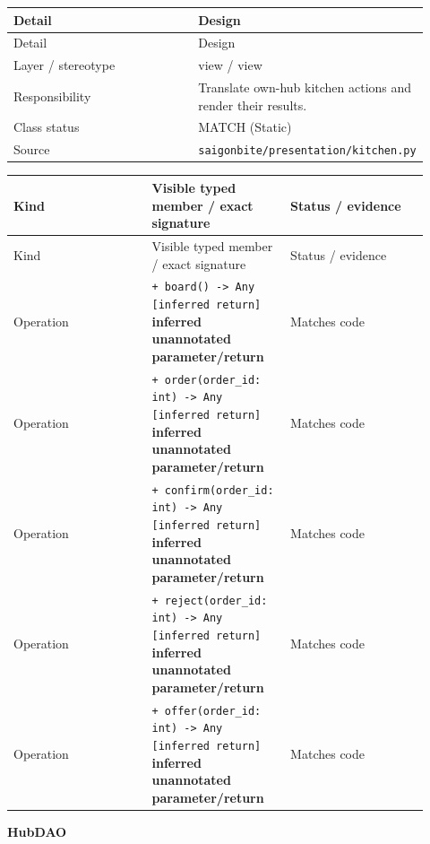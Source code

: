 \begin{longtable}{>{\raggedright\arraybackslash}p{0.4600\linewidth}>{\raggedright\arraybackslash}p{0.4600\linewidth}}
Detail & Design \\
\hline\endfirsthead
Detail & Design \\
\hline\endhead
Layer / stereotype & view / \guillemotleft{}view\guillemotright{} \\
Responsibility & Translate own-hub kitchen actions and render their results. \\
Class status & MATCH (Static) \\
Source & \texttt{saigonbite/\allowbreak{}presentation/\allowbreak{}kitchen.\allowbreak{}py} \\
\end{longtable}
\begin{longtable}{>{\raggedright\arraybackslash}p{0.3067\linewidth}>{\raggedright\arraybackslash}p{0.3067\linewidth}>{\raggedright\arraybackslash}p{0.3067\linewidth}}
Kind & Visible typed member / exact signature & Status / evidence \\
\hline\endfirsthead
Kind & Visible typed member / exact signature & Status / evidence \\
\hline\endhead
Operation & \texttt{+ board() -\textgreater{} Any [inferred return]} \textbf{inferred unannotated parameter/return} & Matches code \\
Operation & \texttt{+ order(order\_\allowbreak{}id: int) -\textgreater{} Any [inferred return]} \textbf{inferred unannotated parameter/return} & Matches code \\
Operation & \texttt{+ confirm(order\_\allowbreak{}id: int) -\textgreater{} Any [inferred return]} \textbf{inferred unannotated parameter/return} & Matches code \\
Operation & \texttt{+ reject(order\_\allowbreak{}id: int) -\textgreater{} Any [inferred return]} \textbf{inferred unannotated parameter/return} & Matches code \\
Operation & \texttt{+ offer(order\_\allowbreak{}id: int) -\textgreater{} Any [inferred return]} \textbf{inferred unannotated parameter/return} & Matches code \\
\end{longtable}
\textbf{HubDAO}

